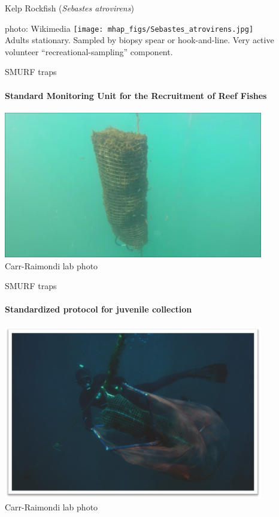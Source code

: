 \documentclass[letter,graphicx]{beamer}
\begin{document}
\begin{frame}{Kelp Rockfish ({\em Sebastes atrovirens})}

{\tiny photo: Wikimedia}
\texttt{[image: mhap\_figs/Sebastes\_atrovirens.jpg]}\\
Adults stationary.  Sampled by biopsy spear or hook-and-line.  Very active volunteer 
``recreational-sampling'' component. 
\end{frame}




\begin{frame}{SMURF traps}
\framesubtitle{Standard Monitoring Unit for the Recruitment of Reef Fishes}
\begin{center}
\includegraphics[width = 0.85\textwidth]{mhap_figs/smurf-solo.png}\\
{\tiny Carr-Raimondi lab photo}
\end{center}
\end{frame}



\begin{frame}{SMURF traps}
\framesubtitle{Standardized protocol for juvenile collection}
\begin{center}
\includegraphics[width = 0.85\textwidth]{mhap_figs/smurf-binkie.png}\\
{\tiny Carr-Raimondi lab photo}
\end{center}
\end{frame}
\end{document}
